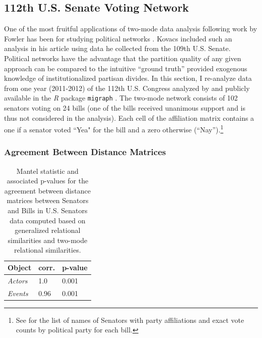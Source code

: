 \documentclass[a4paper,fleqn]{cas-sc}
\begin{document}
\subsection{112th U.S. Senate Voting Network}
One of the most fruitful applications of two-mode data analysis following work by Fowler \citeyearpar{fowler2006legislative} has been for studying political networks \citep[see e.g.,][]{neal2014backbone}. Kovacs included such an analysis in his article using data he collected from the 109th U.S. Senate. Political networks have the advantage that the partition quality of any given approach can be compared to the intuitive ``ground truth'' provided exogenous knowledge of institutionalized partisan divides. In this section, I re-analyze data from one year (2011-2012) of the 112th U.S. Congress analyzed by \citet[Chap. 8]{knoke2021multimodal} and publicly available in the \textit{R} package \texttt{migraph} \citep{Hollway2022-ss}. The two-mode network consists of 102 senators voting on 24 bills (one of the bills received unanimous support and is thus not considered in the analysis). Each cell of the affiliation matrix contains a one if a senator voted ``Yea" for the bill and a zero otherwise (``Nay'').\footnote{See \citet[Appendices 8.1 and 8.2]{knoke2021multimodal} for the list of names of Senators with party affiliations and exact vote counts by political party for each bill.} 

\subsubsection{Agreement Between Distance Matrices}
\begin{table}[ht!]
    \caption{Mantel statistic and associated p-values for the agreement between distance matrices between Senators and Bills in \citet{knoke2021multimodal} U.S. Senators data computed based on generalized relational similarities and two-mode relational similarities.}
    \centering
    \begin{tabular}{lll}
        \hline
        \textbf{Object}                       & \textbf{corr.}            & \textbf{p-value}           \\ \hline
        \multicolumn{1}{|l|}{\textit{Actors}} & \multicolumn{1}{l|}{1.0} & \multicolumn{1}{l|}{0.001} \\ \hline
        \multicolumn{1}{|l|}{\textit{Events}} & \multicolumn{1}{l|}{0.96} & \multicolumn{1}{l|}{0.001} \\ \hline
    \end{tabular}
    \label{tab:mantel-sb}
\end{table}
\end{document}
